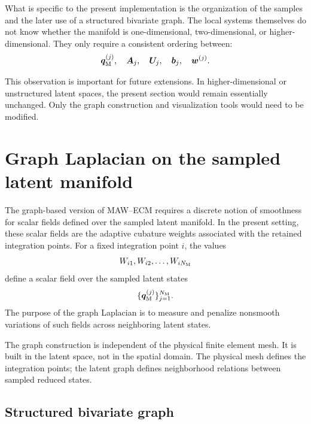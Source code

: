 \documentclass[11pt,a4paper]{article}
\begin{document}
What is specific to the present implementation is the organization of the
samples and the later use of a structured bivariate graph. The local systems
themselves do not know whether the manifold is one-dimensional, two-dimensional,
or higher-dimensional. They only require a consistent ordering between:
\[
        \bm q_{\mathrm{M}}^{(j)},\quad
        \bm A_j,\quad
        \bm U_j,\quad
        \bm b_j,\quad
        \bm w^{(j)}.
\]

This observation is important for future extensions. In higher-dimensional or
unstructured latent spaces, the present section would remain essentially
unchanged. Only the graph construction and visualization tools would need to be
modified.


\section{Graph Laplacian on the sampled latent manifold}
\label{sec:graph_laplacian}

The graph-based version of MAW--ECM requires a discrete notion of smoothness for
scalar fields defined over the sampled latent manifold. In the present setting,
these scalar fields are the adaptive cubature weights associated with the
retained integration points. For a fixed integration point $i$, the values
\[
        W_{i1},W_{i2},\ldots,W_{iN_{\mathrm{M}}}
\]
define a scalar field over the sampled latent states
\[
        \{\bm q_{\mathrm{M}}^{(j)}\}_{j=1}^{N_{\mathrm{M}}}.
\]
The purpose of the graph Laplacian is to measure and penalize nonsmooth
variations of such fields across neighboring latent states.

The graph construction is independent of the physical finite element mesh. It
is built in the latent space, not in the spatial domain. The physical mesh
defines the integration points; the latent graph defines neighborhood relations
between sampled reduced states.

\subsection{Structured bivariate graph}
\end{document}
